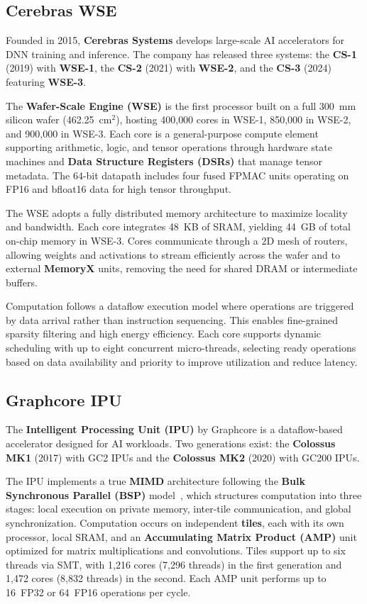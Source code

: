 \subsection{Cerebras WSE}
\label{chap:background:sec:cerebras}

Founded in 2015, \textbf{Cerebras Systems} develops large-scale AI accelerators for DNN training and inference. The company has released three systems: the \textbf{CS-1} (2019) with \textbf{WSE-1}, the \textbf{CS-2} (2021) with \textbf{WSE-2}, and the \textbf{CS-3} (2024) featuring \textbf{WSE-3}.

The \textbf{Wafer-Scale Engine (WSE)} is the first processor built on a full 300~mm silicon wafer (462.25~cm$^2$), hosting 400{,}000 cores in WSE-1, 850{,}000 in WSE-2, and 900{,}000 in WSE-3. Each core is a general-purpose compute element supporting arithmetic, logic, and tensor operations through hardware state machines and \textbf{Data Structure Registers (DSRs)} that manage tensor metadata. The 64-bit datapath includes four fused FPMAC units operating on FP16 and bfloat16 data for high tensor throughput.

The WSE adopts a fully distributed memory architecture to maximize locality and bandwidth. Each core integrates 48~KB of SRAM, yielding 44~GB of total on-chip memory in WSE-3. Cores communicate through a 2D mesh of routers, allowing weights and activations to stream efficiently across the wafer and to external \textbf{MemoryX} units, removing the need for shared DRAM or intermediate buffers.

Computation follows a dataflow execution model where operations are triggered by data arrival rather than instruction sequencing. This enables fine-grained sparsity filtering and high energy efficiency. Each core supports dynamic scheduling with up to eight concurrent micro-threads, selecting ready operations based on data availability and priority to improve utilization and reduce latency.


\subsection{Graphcore IPU}
The \textbf{Intelligent Processing Unit (IPU)} by Graphcore is a dataflow-based accelerator designed for AI workloads. Two generations exist: the \textbf{Colossus MK1} (2017) with GC2 IPUs and the \textbf{Colossus MK2} (2020) with GC200 IPUs.

The IPU implements a true \textbf{MIMD} architecture following the \textbf{Bulk Synchronous Parallel (BSP)} model~\cite{Jia2019}, which structures computation into three stages: local execution on private memory, inter-tile communication, and global synchronization. Computation occurs on independent \textbf{tiles}, each with its own processor, local SRAM, and an \textbf{Accumulating Matrix Product (AMP)} unit optimized for matrix multiplications and convolutions. Tiles support up to six threads via SMT, with 1,216 cores (7,296 threads) in the first generation and 1,472 cores (8,832 threads) in the second. Each AMP unit performs up to 16~FP32 or 64~FP16 operations per cycle.

